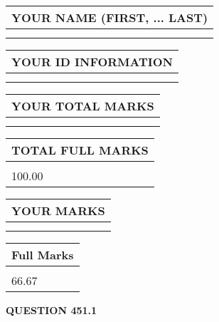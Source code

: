 \documentclass{ctexart}
\begin{document}
   
   
   
\newpage 
\setcounter{page}{ 
   451001 } 
   
   
   
   
\noindent\begin{tabular}{|l|}
\hline
YOUR NAME (FIRST, ... LAST)  \\
\hline
 \\ 
 \\ 
\hline
\end{tabular}
\hspace{0.05in} \begin{tabular}{|l|}
\hline
 YOUR   ID   INFORMATION  \\
\hline
 \\ 
 \\ 
\hline
\end{tabular}
   
   
\vspace{0.2in}\noindent\begin{tabular}{|l|}
\hline
YOUR TOTAL MARKS  \\
\hline
 \\ 
 \\ 
\hline
\end{tabular}
\hspace{0.05in} \begin{tabular}{|l|}
\hline
TOTAL FULL MARKS  \\
\hline
 \\ 
100.00 \\
\hline
\end{tabular}
   
   
 \vspace{0.2in}
 
 
 
 
   
   
  
\vspace{0.2in}
  
\noindent\begin{tabular}{|l|}
\hline
 YOUR MARKS  \\
\hline
 \\ 
 \\ 
\hline
\end{tabular}
\hspace{0.05in} \begin{tabular}{|l|}
\hline
 Full Marks  \\
\hline
 \\ 
66.67 \\
\hline
\end{tabular}
{\textbf{\Large{QUESTION
451.1 
}}}
  
\end{document}

